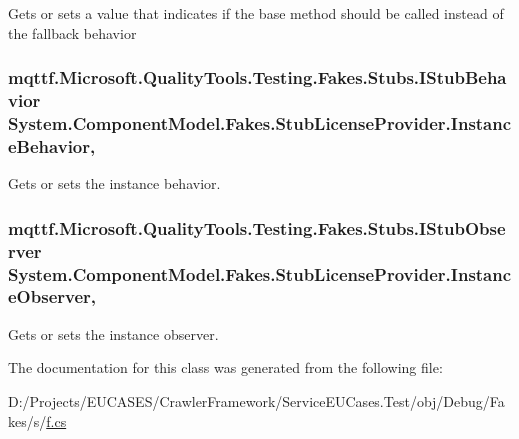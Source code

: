 Gets or sets a value that indicates if the base method should be called instead of the fallback behavior

\hypertarget{class_system_1_1_component_model_1_1_fakes_1_1_stub_license_provider_afd13ec846504b1f2e4cd44ca08fe069c}{
\subsubsection[{Instance\-Behavior}]{\setlength{\rightskip}{0pt plus 5cm}mqttf.\-Microsoft.\-Quality\-Tools.\-Testing.\-Fakes.\-Stubs.\-I\-Stub\-Behavior System.\-Component\-Model.\-Fakes.\-Stub\-License\-Provider.\-Instance\-Behavior\hspace{0.3cm}{\ttfamily [get]}, {\ttfamily [set]}}}\label{class_system_1_1_component_model_1_1_fakes_1_1_stub_license_provider_afd13ec846504b1f2e4cd44ca08fe069c}


Gets or sets the instance behavior.

\hypertarget{class_system_1_1_component_model_1_1_fakes_1_1_stub_license_provider_ae8feeab6bebbb44246ccc3c6eb2285c8}{
\subsubsection[{Instance\-Observer}]{\setlength{\rightskip}{0pt plus 5cm}mqttf.\-Microsoft.\-Quality\-Tools.\-Testing.\-Fakes.\-Stubs.\-I\-Stub\-Observer System.\-Component\-Model.\-Fakes.\-Stub\-License\-Provider.\-Instance\-Observer\hspace{0.3cm}{\ttfamily [get]}, {\ttfamily [set]}}}\label{class_system_1_1_component_model_1_1_fakes_1_1_stub_license_provider_ae8feeab6bebbb44246ccc3c6eb2285c8}


Gets or sets the instance observer.



The documentation for this class was generated from the following file\-:\begin{DoxyCompactItemize}
\item 
D\-:/\-Projects/\-E\-U\-C\-A\-S\-E\-S/\-Crawler\-Framework/\-Service\-E\-U\-Cases.\-Test/obj/\-Debug/\-Fakes/s/\hyperlink{s_2f_8cs}{f.\-cs}\end{DoxyCompactItemize}
